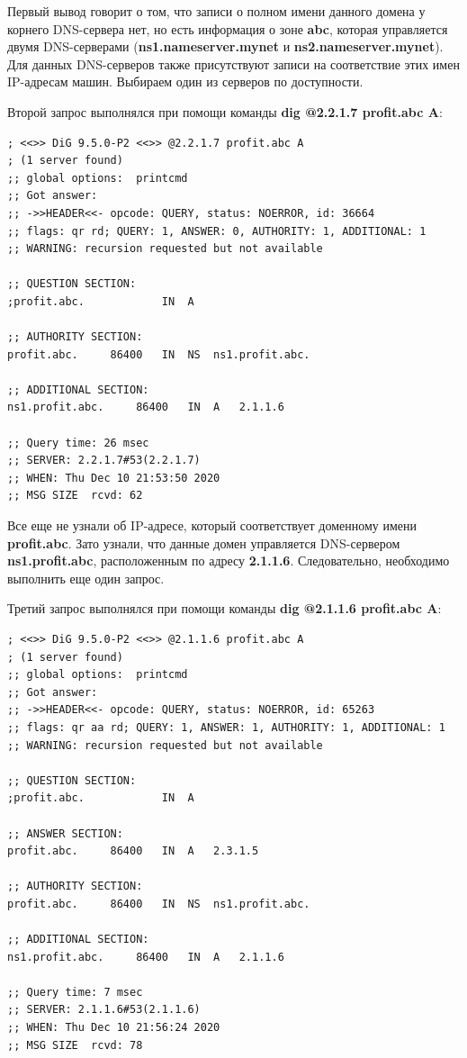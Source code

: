 \documentclass[a4paper,12pt]{article}
\begin{document}
Первый вывод говорит о том, что записи о полном имени данного домена у корнего DNS-сервера нет, но есть информация о зоне \textbf{abc}, которая управляется двумя DNS-серверами (\textbf{ns1.nameserver.mynet} и \textbf{ns2.nameserver.mynet}). Для данных DNS-серверов также присутствуют записи на соответствие этих имен IP-адресам машин. Выбираем один из серверов по доступности.

Второй запрос выполнялся при помощи команды \textbf{dig @2.2.1.7 profit.abc A}:
\begin{verbatim}
; <<>> DiG 9.5.0-P2 <<>> @2.2.1.7 profit.abc A
; (1 server found)
;; global options:  printcmd
;; Got answer:
;; ->>HEADER<<- opcode: QUERY, status: NOERROR, id: 36664
;; flags: qr rd; QUERY: 1, ANSWER: 0, AUTHORITY: 1, ADDITIONAL: 1
;; WARNING: recursion requested but not available

;; QUESTION SECTION:
;profit.abc.			IN	A

;; AUTHORITY SECTION:
profit.abc.		86400	IN	NS	ns1.profit.abc.

;; ADDITIONAL SECTION:
ns1.profit.abc.		86400	IN	A	2.1.1.6

;; Query time: 26 msec
;; SERVER: 2.2.1.7#53(2.2.1.7)
;; WHEN: Thu Dec 10 21:53:50 2020
;; MSG SIZE  rcvd: 62
\end{verbatim}

Все еще не узнали об IP-адресе, который соответствует доменному имени \textbf{profit.abc}. Зато узнали, что данные домен управляется DNS-сервером \textbf{ns1.profit.abc}, расположенным по адресу \textbf{2.1.1.6}. Следовательно, необходимо выполнить еще один запрос.

Третий запрос выполнялся при помощи команды \textbf{dig @2.1.1.6 profit.abc A}:
\begin{verbatim}
; <<>> DiG 9.5.0-P2 <<>> @2.1.1.6 profit.abc A
; (1 server found)
;; global options:  printcmd
;; Got answer:
;; ->>HEADER<<- opcode: QUERY, status: NOERROR, id: 65263
;; flags: qr aa rd; QUERY: 1, ANSWER: 1, AUTHORITY: 1, ADDITIONAL: 1
;; WARNING: recursion requested but not available

;; QUESTION SECTION:
;profit.abc.			IN	A

;; ANSWER SECTION:
profit.abc.		86400	IN	A	2.3.1.5

;; AUTHORITY SECTION:
profit.abc.		86400	IN	NS	ns1.profit.abc.

;; ADDITIONAL SECTION:
ns1.profit.abc.		86400	IN	A	2.1.1.6

;; Query time: 7 msec
;; SERVER: 2.1.1.6#53(2.1.1.6)
;; WHEN: Thu Dec 10 21:56:24 2020
;; MSG SIZE  rcvd: 78
\end{verbatim}
\end{document}
